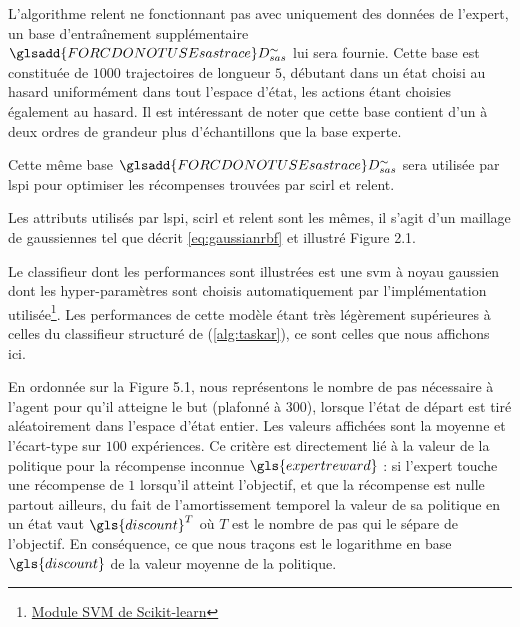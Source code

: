 \documentclass[frenchb,a4paper,justified,notoc]{tufte-book}
\newcommand{\discount}{\gls{discount}}
\newcommand{\expertreward}{\gls{expertreward}}
\newcommand{\sastrace}[1]{\ensuremath{\glsadd{FORCDONOTUSEsastrace}D_{sas}^{#1}}}
\begin{document}
    L'algorithme \gls{relent} ne fonctionnant pas avec uniquement des données de l'expert, un base d'entraînement supplémentaire $\sastrace{\sim}$ lui sera fournie. Cette base est constituée de $1000$ trajectoires de longueur $5$, débutant dans un état choisi au hasard uniformément dans tout l'espace d'état, les actions étant choisies également au hasard. Il est intéressant de noter que cette base contient d'un à deux ordres de grandeur plus d'échantillons que la base experte.
    
    Cette même base $\sastrace{\sim}$ sera utilisée par \gls{lspi} pour optimiser les récompenses trouvées par \gls{scirl} et \gls{relent}.

    Les attributs utilisés par \gls{lspi}, \gls{scirl} et \gls{relent} sont les mêmes, il s'agit d'un maillage de gaussiennes tel que décrit \autoref{eq:gaussianrbf} et illustré Figure 2.1.

    Le classifieur dont les performances sont illustrées est une \gls{svm} à noyau gaussien dont les hyper-paramètres sont choisis automatiquement par l'implémentation utilisée\footnote{\href{http://scikit-learn.org/stable/modules/generated/sklearn.svm.SVC.html}{Module SVM de Scikit-learn}
 }. Les performances de cette modèle étant très légèrement supérieures à celles du classifieur structuré de \citet{taskar2005learning} (\autoref{alg:taskar}), ce sont celles que nous affichons ici.

    En ordonnée sur la Figure 5.1,
 nous représentons le nombre de pas nécessaire à l'agent pour qu'il atteigne le but (plafonné à $300$), lorsque l'état de départ est tiré aléatoirement dans l'espace d'état entier. Les valeurs affichées sont la moyenne et l'écart-type sur $100$ expériences. Ce critère est directement lié à la valeur de la politique pour la récompense inconnue $\expertreward$ : si l'expert touche une récompense de $1$ lorsqu'il atteint l'objectif, et que la récompense est nulle partout ailleurs, du fait de l'amortissement temporel la valeur de sa politique en un état vaut $\discount^T$ où $T$ est le nombre de pas qui le sépare de l'objectif. En conséquence, ce que nous traçons est le logarithme en base $\discount$ de la valeur moyenne de la politique.
\end{document}
